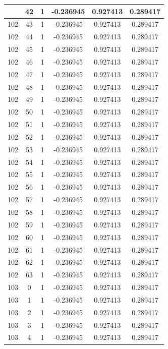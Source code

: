 \documentclass[12pt,a4paper]{article}
\numberwithin{equation}{section}
\numberwithin{figure}{section}
\numberwithin{table}{section}
\begin{document}
\begin{longtable}{|c|c|c|c|c|c|}
\pagebreak
102 & 42 & 1 & -0.236945 & 0.927413 & 0.289417 \\ \hline
102 & 43 & 1 & -0.236945 & 0.927413 & 0.289417 \\ \hline
102 & 44 & 1 & -0.236945 & 0.927413 & 0.289417 \\ \hline
102 & 45 & 1 & -0.236945 & 0.927413 & 0.289417 \\ \hline
102 & 46 & 1 & -0.236945 & 0.927413 & 0.289417 \\ \hline
102 & 47 & 1 & -0.236945 & 0.927413 & 0.289417 \\ \hline
102 & 48 & 1 & -0.236945 & 0.927413 & 0.289417 \\ \hline
102 & 49 & 1 & -0.236945 & 0.927413 & 0.289417 \\ \hline
102 & 50 & 1 & -0.236945 & 0.927413 & 0.289417 \\ \hline
102 & 51 & 1 & -0.236945 & 0.927413 & 0.289417 \\ \hline
102 & 52 & 1 & -0.236945 & 0.927413 & 0.289417 \\ \hline
102 & 53 & 1 & -0.236945 & 0.927413 & 0.289417 \\ \hline
102 & 54 & 1 & -0.236945 & 0.927413 & 0.289417 \\ \hline
102 & 55 & 1 & -0.236945 & 0.927413 & 0.289417 \\ \hline
102 & 56 & 1 & -0.236945 & 0.927413 & 0.289417 \\ \hline
102 & 57 & 1 & -0.236945 & 0.927413 & 0.289417 \\ \hline
102 & 58 & 1 & -0.236945 & 0.927413 & 0.289417 \\ \hline
102 & 59 & 1 & -0.236945 & 0.927413 & 0.289417 \\ \hline
102 & 60 & 1 & -0.236945 & 0.927413 & 0.289417 \\ \hline
102 & 61 & 1 & -0.236945 & 0.927413 & 0.289417 \\ \hline
102 & 62 & 1 & -0.236945 & 0.927413 & 0.289417 \\ \hline
102 & 63 & 1 & -0.236945 & 0.927413 & 0.289417 \\ \hline
103 & 0 & 1 & -0.236945 & 0.927413 & 0.289417 \\ \hline
103 & 1 & 1 & -0.236945 & 0.927413 & 0.289417 \\ \hline
103 & 2 & 1 & -0.236945 & 0.927413 & 0.289417 \\ \hline
103 & 3 & 1 & -0.236945 & 0.927413 & 0.289417 \\ \hline
103 & 4 & 1 & -0.236945 & 0.927413 & 0.289417 \\ \hline

\end{longtable}
\end{document}
